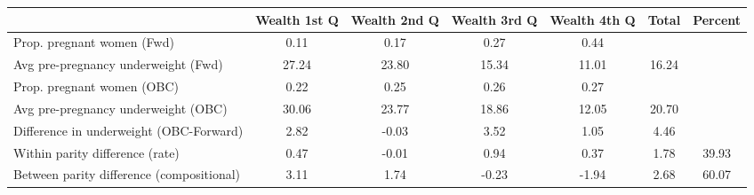 \begin{tabular}{l*{6}{c}}
\toprule
            &\multicolumn{1}{c}{Wealth 1st Q}&\multicolumn{1}{c}{Wealth 2nd Q}&\multicolumn{1}{c}{Wealth 3rd Q}&\multicolumn{1}{c}{Wealth 4th Q}&\multicolumn{1}{c}{Total}&\multicolumn{1}{c}{Percent}\\
\midrule
\midrule
Prop. pregnant women (Fwd)&        0.11&        0.17&        0.27&        0.44&            &            \\
Avg pre-pregnancy underweight (Fwd)&       27.24&       23.80&       15.34&       11.01&       16.24&            \\
Prop. pregnant women (OBC)&        0.22&        0.25&        0.26&        0.27&            &            \\
Avg pre-pregnancy underweight (OBC)&       30.06&       23.77&       18.86&       12.05&       20.70&            \\
Difference in underweight (OBC-Forward)&        2.82&       -0.03&        3.52&        1.05&        4.46&            \\
Within parity difference (rate)&        0.47&       -0.01&        0.94&        0.37&        1.78&       39.93\\
Between parity difference (compositional)&        3.11&        1.74&       -0.23&       -1.94&        2.68&       60.07\\
\bottomrule
\end{tabular}
